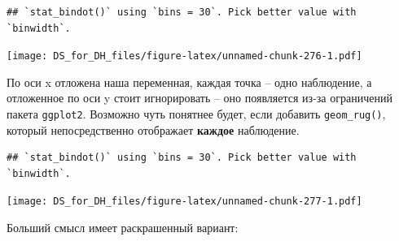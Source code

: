 \documentclass[
]{book}
\newenvironment{Shaded}{\begin{snugshade}}{\end{snugshade}}
\newcommand{\CommentTok}[1]{\textcolor[rgb]{0.56,0.35,0.01}{\textit{#1}}}
\newcommand{\DataTypeTok}[1]{\textcolor[rgb]{0.13,0.29,0.53}{#1}}
\newcommand{\KeywordTok}[1]{\textcolor[rgb]{0.13,0.29,0.53}{\textbf{#1}}}
\newcommand{\NormalTok}[1]{#1}
\newcommand{\OperatorTok}[1]{\textcolor[rgb]{0.81,0.36,0.00}{\textbf{#1}}}
\newcommand{\OtherTok}[1]{\textcolor[rgb]{0.56,0.35,0.01}{#1}}
\newcommand{\StringTok}[1]{\textcolor[rgb]{0.31,0.60,0.02}{#1}}
\begin{document}
\begin{verbatim}
## `stat_bindot()` using `bins = 30`. Pick better value with `binwidth`.
\end{verbatim}

\texttt{[image: DS\_for\_DH\_files/figure-latex/unnamed-chunk-276-1.pdf]}

По оси x отложена наша переменная, каждая точка -- одно наблюдение, а отложенное по оси y стоит игнорировать -- оно появляется из-за ограничений пакета \texttt{ggplot2}. Возможно чуть понятнее будет, если добавить \texttt{geom\_rug()}, который непосредственно отображает \textbf{каждое} наблюдение.

\begin{Shaded}
\end{Shaded}

\begin{verbatim}
## `stat_bindot()` using `bins = 30`. Pick better value with `binwidth`.
\end{verbatim}

\texttt{[image: DS\_for\_DH\_files/figure-latex/unnamed-chunk-277-1.pdf]}

Больший смысл имеет раскрашенный вариант:

\begin{Shaded}
\end{Shaded}
\end{document}
